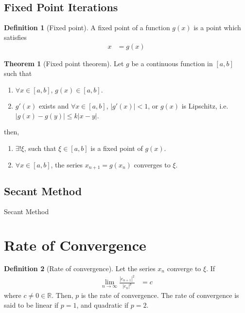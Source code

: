 \documentclass[fleqn, a4paper, 12pt, twoside, titlepage]{article}
\theoremstyle{definition}
\newtheorem{definition}{Definition}
\theoremstyle{theorem}
\newtheorem{theorem}{Theorem}
\begin{document}
\subsection{Fixed Point Iterations}

\begin{definition}[Fixed point]
	A fixed point of a function $g(x)$ is a point which satisfies
	\begin{align*}
		x &= g(x)
	\end{align*}
\end{definition}

\begin{theorem}[Fixed point theorem]
	Let $g$ be a continuous function in $[a,b]$ such that
	\begin{enumerate}
		\item $\forall x \in [a,b]$, $g(x) \in [a,b]$.
		\item $g'(x)$ exists and $\forall x \in [a,b]$, $\left| g'(x) \right| < 1$, or $g(x)$ is Lipschitz, i.e. $\left| g(x) - g(y) \right| \le k |x - y|$.
	\end{enumerate}
	then,
	\begin{enumerate}
		\item $\exists ! \xi$, such that $\xi \in [a,b]$ is a fixed point of $g(x)$.
		\item $\forall x \in [a,b]$, the series $x_{n + 1} = g(x_n)$ converges to $\xi$.
	\end{enumerate}
	\label{thm:Fixed_point_theorem}
\end{theorem}

\subsection{Secant Method}

\begin{algorithm}[H]
	\begin{algorithmic}[1]
	\end{algorithmic}
	\caption{Secant Method}
\end{algorithm}

\section{Rate of Convergence}

\begin{definition}[Rate of convergence]
	Let the series $x_n$ converge to $\xi$.
	If
	\begin{align*}
		\lim\limits_{n \to \infty} \frac{\left| e_{n + 1} \right|^2}{\left| e_n \right|^p} &= c
	\end{align*}
	where $c \neq 0 \in \mathbb{R}$.
	Then, $p$ is the rate of convergence.
	The rate of convergence is said to be linear if $p = 1$, and quadratic if $p = 2$.
\end{definition}
\end{document}
